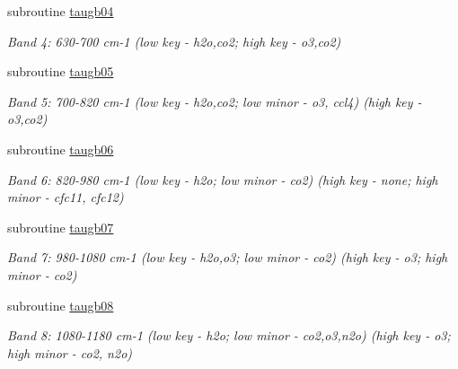 \begin{DoxyCompactItemize}
subroutine \hyperlink{radlw__main_8f_ae69174bcf1a87dc7a5baffac69797d07}{taugb04}
\begin{DoxyCompactList}\small\item\em Band 4\+: 630-\/700 cm-\/1 (low key -\/ h2o,co2; high key -\/ o3,co2) \end{DoxyCompactList}\item 
\mbox{\label{radlw__main_8f_a92653ffcd20ff247a00eaf3339cba6df}} 
subroutine \hyperlink{radlw__main_8f_a92653ffcd20ff247a00eaf3339cba6df}{taugb05}
\begin{DoxyCompactList}\small\item\em Band 5\+: 700-\/820 cm-\/1 (low key -\/ h2o,co2; low minor -\/ o3, ccl4) (high key -\/ o3,co2) \end{DoxyCompactList}\item 
\mbox{\label{radlw__main_8f_a7190d415614aa35deefacff1041d4719}} 
subroutine \hyperlink{radlw__main_8f_a7190d415614aa35deefacff1041d4719}{taugb06}
\begin{DoxyCompactList}\small\item\em Band 6\+: 820-\/980 cm-\/1 (low key -\/ h2o; low minor -\/ co2) (high key -\/ none; high minor -\/ cfc11, cfc12) \end{DoxyCompactList}\item 
\mbox{\label{radlw__main_8f_a2208d86ae0712a0ca426bbe96de825bc}} 
subroutine \hyperlink{radlw__main_8f_a2208d86ae0712a0ca426bbe96de825bc}{taugb07}
\begin{DoxyCompactList}\small\item\em Band 7\+: 980-\/1080 cm-\/1 (low key -\/ h2o,o3; low minor -\/ co2) (high key -\/ o3; high minor -\/ co2) \end{DoxyCompactList}\item 
\mbox{\label{radlw__main_8f_a1447d5bda5b521d27171e61881684183}} 
subroutine \hyperlink{radlw__main_8f_a1447d5bda5b521d27171e61881684183}{taugb08}
\begin{DoxyCompactList}\small\item\em Band 8\+: 1080-\/1180 cm-\/1 (low key -\/ h2o; low minor -\/ co2,o3,n2o) (high key -\/ o3; high minor -\/ co2, n2o) \end{DoxyCompactList}\item 
\mbox{\label{radlw__main_8f_a889abbaaa2d421c0c3dc820e2004414d}} 

\end{DoxyCompactItemize}

